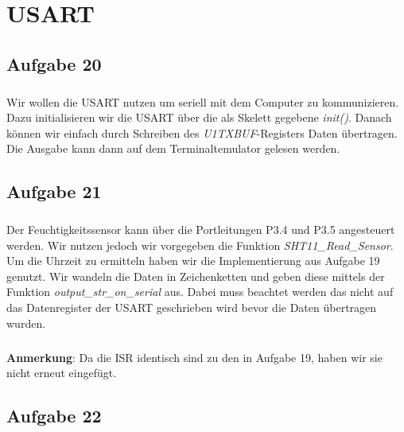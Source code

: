 \chapter{USART}

\section*{Aufgabe 20}

\paragraph*{}
Wir wollen die USART nutzen um seriell mit dem Computer zu kommunizieren. Dazu initialisieren wir die USART über die als Skelett gegebene {\em init()}. Danach können wir einfach durch Schreiben des {\em U1TXBUF}-Registers Daten übertragen. Die Ausgabe kann dann auf dem Terminaltemulator gelesen werden.\\



\section*{Aufgabe 21}

\paragraph*{}
Der Feuchtigkeitssensor kann über die Portleitungen P3.4 und P3.5 angesteuert werden. Wir nutzen jedoch wir vorgegeben die Funktion {\em SHT11\_Read\_Sensor}. Um die Uhrzeit zu ermitteln haben wir die Implementierung aus Aufgabe 19 genutzt. Wir wandeln die Daten in Zeichenketten und geben diese mittels der Funktion {\em output\_str\_on\_serial} aus. Dabei muss beachtet werden das nicht auf das Datenregister der USART geschrieben wird bevor die Daten übertragen wurden.\\



\paragraph*{}
\textbf{Anmerkung}: Da die ISR identisch sind zu den in Aufgabe 19, haben wir sie nicht erneut eingefügt.

\section*{Aufgabe 22}

